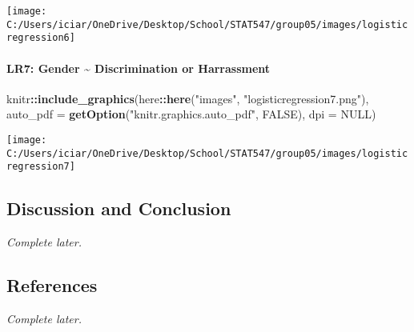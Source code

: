 \documentclass[
]{article}
\newenvironment{Shaded}{\begin{snugshade}}{\end{snugshade}}
\newcommand{\DataTypeTok}[1]{\textcolor[rgb]{0.13,0.29,0.53}{#1}}
\newcommand{\KeywordTok}[1]{\textcolor[rgb]{0.13,0.29,0.53}{\textbf{#1}}}
\newcommand{\NormalTok}[1]{#1}
\newcommand{\OperatorTok}[1]{\textcolor[rgb]{0.81,0.36,0.00}{\textbf{#1}}}
\newcommand{\OtherTok}[1]{\textcolor[rgb]{0.56,0.35,0.01}{#1}}
\newcommand{\StringTok}[1]{\textcolor[rgb]{0.31,0.60,0.02}{#1}}
\begin{document}
\texttt{[image: C:/Users/iciar/OneDrive/Desktop/School/STAT547/group05/images/logisticregression6]}

\hypertarget{lr7-gender-discrimination-or-harrassment}{%
\paragraph{LR7: Gender \textasciitilde{} Discrimination or
Harrassment}\label{lr7-gender-discrimination-or-harrassment}}

\begin{Shaded}
\begin{Highlighting}[]
\NormalTok{knitr}\OperatorTok{::}\KeywordTok{include_graphics}\NormalTok{(here}\OperatorTok{::}\KeywordTok{here}\NormalTok{(}\StringTok{"images"}\NormalTok{, }\StringTok{"logisticregression7.png"}\NormalTok{), }\DataTypeTok{auto_pdf =} \KeywordTok{getOption}\NormalTok{(}\StringTok{"knitr.graphics.auto_pdf"}\NormalTok{, }\OtherTok{FALSE}\NormalTok{), }
    \DataTypeTok{dpi =} \OtherTok{NULL}\NormalTok{)}
\end{Highlighting}
\end{Shaded}

\texttt{[image: C:/Users/iciar/OneDrive/Desktop/School/STAT547/group05/images/logisticregression7]}

\hypertarget{discussion-and-conclusion}{%
\subsection{Discussion and Conclusion}\label{discussion-and-conclusion}}

\emph{Complete later.}

\hypertarget{references}{%
\subsection{References}\label{references}}

\emph{Complete later.}
\end{document}
